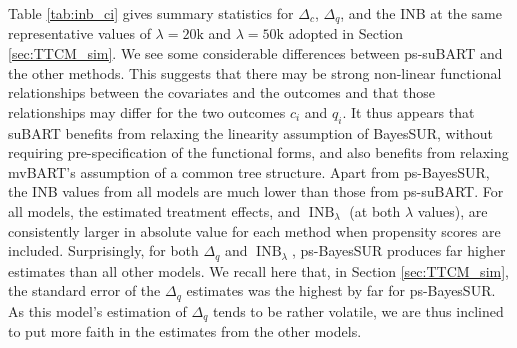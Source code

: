 \documentclass[aoas,preprint]{imsart}
\theoremstyle{plain}
\theoremstyle{definition}
\theoremstyle{remark}
\begin{document}
Table \ref{tab:inb_ci} gives summary statistics for $\Delta_c$, $\Delta_q$, and the INB at the same representative values of $\lambda = 20\mathrm{k}$ and $\lambda=50\mathrm{k}$ adopted in Section \ref{sec:TTCM_sim}. 
We see some considerable differences between ps-suBART and the other methods. This suggests that there may be strong non-linear functional relationships between the covariates and the outcomes and that those relationships may differ for the two outcomes $c_i$ and $q_i$. It thus appears that suBART benefits from relaxing the linearity assumption of BayesSUR, without requiring pre-specification of the functional forms, and also benefits from relaxing mvBART's assumption of a common tree structure. Apart from ps-BayesSUR, the INB values from all models are much lower than those from ps-suBART. For all models, the estimated treatment effects, and $\operatorname{INB}_\lambda$ (at both $\lambda$ values), are consistently larger in absolute value for each method when propensity scores are included. 
Surprisingly, for both $\Delta_q$ and $\operatorname{INB}_\lambda$, ps-BayesSUR produces far higher estimates than all other models.
We recall here that, in Section \ref{sec:TTCM_sim}, the standard error of the $\Delta_q$ estimates was the highest by far for ps-BayesSUR. As this model's estimation of $\Delta_q$ tends to be rather volatile, we are thus inclined to put more faith in the estimates from the other models.\vspace{-1ex}
\end{document}
